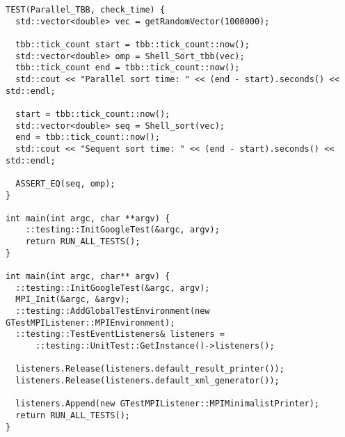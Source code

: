 \documentclass{report}
\begin{document}
\begin{lstlisting}
TEST(Parallel_TBB, check_time) {
  std::vector<double> vec = getRandomVector(1000000);

  tbb::tick_count start = tbb::tick_count::now();
  std::vector<double> omp = Shell_Sort_tbb(vec);
  tbb::tick_count end = tbb::tick_count::now();
  std::cout << "Parallel sort time: " << (end - start).seconds() << std::endl;

  start = tbb::tick_count::now();
  std::vector<double> seq = Shell_sort(vec);
  end = tbb::tick_count::now();
  std::cout << "Sequent sort time: " << (end - start).seconds() << std::endl;

  ASSERT_EQ(seq, omp);
}

int main(int argc, char **argv) {
    ::testing::InitGoogleTest(&argc, argv);
    return RUN_ALL_TESTS();
}

int main(int argc, char** argv) {
  ::testing::InitGoogleTest(&argc, argv);
  MPI_Init(&argc, &argv);
  ::testing::AddGlobalTestEnvironment(new GTestMPIListener::MPIEnvironment);
  ::testing::TestEventListeners& listeners =
      ::testing::UnitTest::GetInstance()->listeners();

  listeners.Release(listeners.default_result_printer());
  listeners.Release(listeners.default_xml_generator());

  listeners.Append(new GTestMPIListener::MPIMinimalistPrinter);
  return RUN_ALL_TESTS();
}

\end{lstlisting}
    
\end{document}
